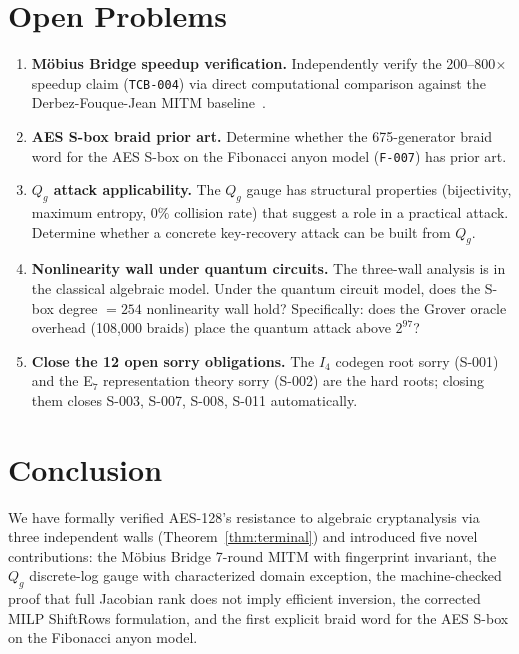 \documentclass[11pt,letterpaper]{article}
\begin{document}
\section{Open Problems}
\label{sec:open}

\begin{enumerate}
\item \textbf{M\"obius Bridge speedup verification.}
  Independently verify the 200--800$\times$ speedup claim
  (\texttt{TCB-004}) via direct computational comparison against the
  Derbez-Fouque-Jean MITM baseline~\cite{derbez2013}.

\item \textbf{AES S-box braid prior art.}
  Determine whether the 675-generator braid word for the AES S-box
  on the Fibonacci anyon model (\texttt{F-007}) has prior art.

\item \textbf{$Q_g$ attack applicability.}
  The $Q_g$ gauge has structural properties (bijectivity, maximum entropy,
  $0\%$ collision rate) that suggest a role in a practical attack.
  Determine whether a concrete key-recovery attack can be built from $Q_g$.

\item \textbf{Nonlinearity wall under quantum circuits.}
  The three-wall analysis is in the classical algebraic model.
  Under the quantum circuit model, does the S-box degree $= 254$
  nonlinearity wall hold?  Specifically: does the Grover oracle
  overhead (108,000 braids) place the quantum attack above $2^{97}$?

\item \textbf{Close the 12 open sorry obligations.}
  The $I_4$ codegen root sorry (S-001) and the E$_7$ representation
  theory sorry (S-002) are the hard roots; closing them closes
  S-003, S-007, S-008, S-011 automatically.
\end{enumerate}

\section{Conclusion}
\label{sec:conclusion}

We have formally verified AES-128's resistance to algebraic cryptanalysis
via three independent walls (Theorem~\ref{thm:terminal}) and introduced
five novel contributions: the M\"obius Bridge 7-round MITM with fingerprint
invariant, the $Q_g$ discrete-log gauge with characterized domain exception,
the machine-checked proof that full Jacobian rank does not imply efficient
inversion, the corrected MILP ShiftRows formulation, and the first explicit
braid word for the AES S-box on the Fibonacci anyon model.
\end{document}
